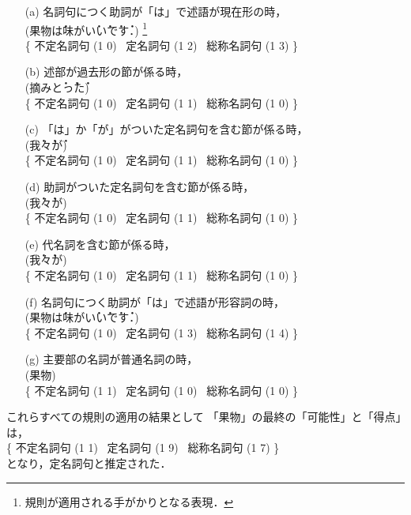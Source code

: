 \begin{itemize}
\item[(a)] 名詞句につく助詞が「は」で述語が現在形の時，\\(果物\.は味が\.い\.い\.で\.す．)
\footnote{規則が適用される手がかりとなる表現．}
\\
\{
\mbox{不定名詞句}  (1 0) \,
\mbox{定名詞句}  (1 2)   \,
\mbox{総称名詞句}  (1 3)
\}

\item[(b)] 述部が過去形の節が係る時，\\(摘み\.と\.っ\.た)\\
\{
\mbox{不定名詞句}  (1  0) \,
\mbox{定名詞句}    (1  1) \, 
\mbox{総称名詞句}  (1  0)
\}

\item[(c)] 「は」か「が」がついた定名詞句を含む節が係る時，\\(\.我\.々\.が)\\
\{
\mbox{不定名詞句}  (1  0) \,
\mbox{定名詞句}  (1  1) \,
\mbox{総称名詞句}  (1  0)
\}

\item[(d)] 助詞がついた定名詞句を含む節が係る時，\\(\.我\.々が)\\
\{
\mbox{不定名詞句}  (1  0) \,
\mbox{定名詞句}  (1  1) \,
\mbox{総称名詞句}  (1  0)
\}

\item[(e)] 代名詞を含む節が係る時，\\(\.我\.々が)\\
\{
\mbox{不定名詞句}  (1  0) \,
\mbox{定名詞句}    (1  1) \,
\mbox{総称名詞句}  (1  0)
\}

\item[(f)] 名詞句につく助詞が「は」で述語が形容詞の時，\\(果物\.は味が\.い\.い\.で\.す．)\\
\{
\mbox{不定名詞句}  (1  0) \,
\mbox{定名詞句}    (1  3) \,
\mbox{総称名詞句}  (1  4)
\}

\item[(g)] 主要部の名詞が普通名詞の時，\\(果物)\\
\{
\mbox{不定名詞句}  (1  1) \,
\mbox{定名詞句}    (1  0) \,
\mbox{総称名詞句}  (1  0)
\}

\end{itemize}
\smallskip
これらすべての規則の適用の結果として
「果物」の最終の「可能性」と「得点」は，\\
\hspace*{9mm}
\{
\mbox{不定名詞句}  (1  1) \,
\mbox{定名詞句}    (1  9) \,
\mbox{総称名詞句}  (1  7)
\}\\
となり，定名詞句と推定された．

